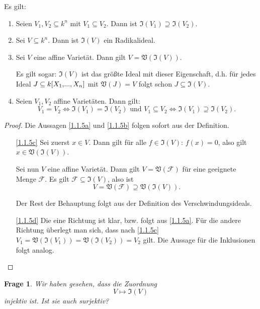 \documentclass[a4paper,12pt,index=toc]{scrbook}
\theoremstyle{keinenummern} %
\newtheorem{q}{Frage}
\def\V{\mathfrak{V}}
\def\I{\mathfrak{I}}
\newcommand{\F}{\mathcal{F}}
\renewcommand{\dotsc}{\ensuremath{\!...}}
\newcommand{\polyx}[1][n]{\ensuremath%
  [X_{1},\dotsc,X_{#1}]}
\begin{document}
\begin{bem}\label{1.1.5} Es gilt:
\begin{enumerate}
\item{} Seien $V_{1},V_{2}\subseteq k^{n}$ mit $V_{1}\subseteq V_{2}$. Dann ist $\I(V_{1})\supseteq \I(V_{2})$.
\item{} Sei $V\subseteq k^{n}$. Dann ist $\I(V)$ ein Radikalideal.
\item{} Sei $V$ eine affine Varietät. Dann gilt $V=\V(\I(V))$.

Es gilt sogar: $\I(V)$ ist das größte Ideal mit dieser Eigenschaft, d.h. für jedes Ideal $J\subseteq k\polyx$ mit $\V(J)=V$ folgt schon $J\subseteq \I(V)$.
\item{} Seien $V_{1},V_{2}$ affine Varietäten. Dann gilt:
\begin{equation*}V_{1}=V_{2}\iff \I(V_{1})=\I(V_{2})\text{ und } V_{1}\subseteq V_{2}\iff \I(V_{1})\supseteq \I(V_{2}).\end{equation*}
\end{enumerate}
\end{bem}

\begin{proof} Die Aussagen \ref{1.1.5a} und \ref{1.1.5b} folgen sofort aus der Definition.
\begin{enumerate}
\item[\ref{1.1.5c}] Sei zuerst $x\in V$. Dann gilt für alle $f\in \I(V)$: $f(x)=0$, also gilt $x\in \V(\I(V))$.

Sei nun $V$ eine affine Varietät. Dann gilt $V=\V(\F)$ für eine geeignete Menge $\F$. Es gilt $\F\subseteq \I(V)$, also ist
\begin{equation*}V=\V(\F)\supseteq \V(\I(V)).\end{equation*}

Der Rest der Behauptung folgt aus der Definition des Verschwindungsideals.
\item[\ref{1.1.5d}] Die eine Richtung ist klar, bzw. folgt aus \ref{1.1.5a}. Für die andere Richtung überlegt man sich, dass nach \ref{1.1.5c} $V_{1}=\V(\I(V_{1}))=\V(\I(V_{2}))=V_{2}$ gilt.  Die Aussage für die Inklusionen folgt analog.
\end{enumerate}
\end{proof}

\begin{q}
Wir haben gesehen, dass die Zuordnung
\begin{equation*}V\mapsto \I(V)\end{equation*}
injektiv ist. Ist sie auch surjektiv?
\end{q}
\end{document}
